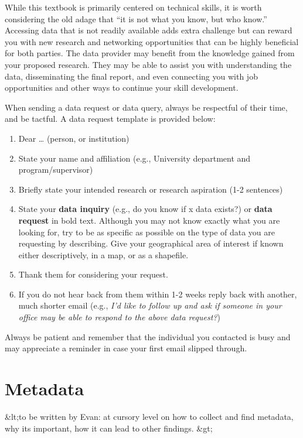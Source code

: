 \documentclass[
]{book}
\providecommand{\tightlist}{%
  \setlength{\itemsep}{0pt}\setlength{\parskip}{0pt}}
\begin{document}
While this textbook is primarily centered on technical skills, it is worth considering the old adage that ``it is not what you know, but who know.'' Accessing data that is not readily available adds extra challenge but can reward you with new research and networking opportunities that can be highly beneficial for both parties. The data provider may benefit from the knowledge gained from your proposed research. They may be able to assist you with understanding the data, disseminating the final report, and even connecting you with job opportunities and other ways to continue your skill development.

When sending a data request or data query, always be respectful of their time, and be tactful. A data request template is provided below:

\begin{enumerate}
\def\labelenumi{\arabic{enumi}.}
\tightlist
\item
  Dear \ldots{} (person, or institution)
\item
  State your name and affiliation (e.g., University department and program/supervisor)
\item
  Briefly state your intended research or research aspiration (1-2 sentences)
\item
  State your \textbf{data inquiry} (e.g., do you know if x data exists?) or \textbf{data request} in bold text. Although you may not know exactly what you are looking for, try to be as specific as possible on the type of data you are requesting by describing. Give your geographical area of interest if known either descriptively, in a map, or as a shapefile.
\item
  Thank them for considering your request.
\item
  If you do not hear back from them within 1-2 weeks reply back with another, much shorter email (e.g., \emph{I'd like to follow up and ask if someone in your office may be able to respond to the above data request?})
\end{enumerate}

Always be patient and remember that the individual you contacted is busy and may appreciate a reminder in case your first email slipped through.

\hypertarget{metadata}{%
\section{Metadata}\label{metadata}}

\&lt;to be written by Evan: at cursory level on how to collect and find metadata, why its important, how it can lead to other findings. \&gt;
\end{document}
